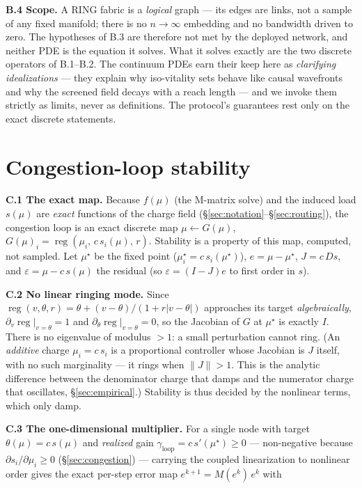 \documentclass[11pt]{article}
\theoremstyle{plain}
\numberwithin{equation}{section}
\begin{document}
\textbf{B.4 Scope.} A RING fabric is a \emph{logical} graph — its edges are links, not a sample of any fixed manifold; there is no $n\!\to\!\infty$ embedding and no bandwidth driven to zero. The hypotheses of B.3 are therefore not met by the deployed network, and neither PDE is the equation it solves. What it solves exactly are the two discrete operators of B.1–B.2. The continuum PDEs earn their keep here as \emph{clarifying idealizations} — they explain why iso-vitality sets behave like causal wavefronts and why the screened field decays with a reach length — and we invoke them strictly as limits, never as definitions. The protocol's guarantees rest only on the exact discrete statements.

\section{Congestion-loop stability}\label{app:congestion}

\textbf{C.1 The exact map.} Because $f(\mu)$ (the M-matrix solve) and the induced load $s(\mu)$ are \emph{exact} functions of the charge field (§\ref{sec:notation}–§\ref{sec:routing}), the congestion loop is an exact discrete map $\mu\leftarrow G(\mu)$, $G(\mu)_i=\operatorname{reg}(\mu_i,\,c\,s_i(\mu),\,r)$. Stability is a property of this map, computed, not sampled. Let $\mu^\star$ be the fixed point ($\mu^\star_i=c\,s_i(\mu^\star)$), $e=\mu-\mu^\star$, $J=c\,Ds$, and $\varepsilon=\mu-c\,s(\mu)$ the residual (so $\varepsilon=(I-J)e$ to first order in $s$).

\textbf{C.2 No linear ringing mode.} Since $\operatorname{reg}(v,\theta,r)=\theta+(v-\theta)/(1+r|v-\theta|)$ approaches its target \emph{algebraically}, $\partial_v\operatorname{reg}|_{v=\theta}=1$ and $\partial_\theta\operatorname{reg}|_{v=\theta}=0$, so the Jacobian of $G$ at $\mu^\star$ is exactly $I$. There is no eigenvalue of modulus $>1$: a small perturbation cannot ring. (An \emph{additive} charge $\mu_i=c\,s_i$ is a proportional controller whose Jacobian is $J$ itself, with no such marginality — it rings when $\|J\|>1$. This is the analytic difference between the denominator charge that damps and the numerator charge that oscillates, §\ref{sec:empirical}.) Stability is thus decided by the nonlinear terms, which only damp.

\textbf{C.3 The one-dimensional multiplier.} For a single node with target $\theta(\mu)=c\,s(\mu)$ and \emph{realized} gain $\gamma_{\mathrm{loop}}=c\,s'(\mu^\star)\ge0$ — non-negative because $\partial s_i/\partial\mu_i\ge0$ (§\ref{sec:congestion}) — carrying the coupled linearization to nonlinear order gives the exact per-step error map $e^{k+1}=M(e^k)\,e^k$ with
\end{document}
